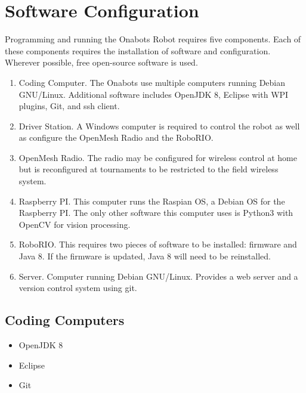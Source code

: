 \chapter{Software Configuration}

Programming and running the Onabots Robot requires five components. Each of these components requires the installation of software and configuration. Wherever possible, free open-source software is used.

\begin{enumerate}[label=$\Box$]

	\item Coding Computer. The Onabots use multiple computers running Debian GNU/Linux. Additional software includes OpenJDK 8, Eclipse with WPI plugins, Git, and ssh client.

	\item Driver Station. A Windows computer is required to control the robot as well as configure the OpenMesh Radio and the RoboRIO.

	\item OpenMesh Radio. The radio may be configured for wireless control at home but is reconfigured at tournaments to be restricted to the field wireless system.

	\item Raspberry PI. This computer runs the Raspian OS, a Debian OS for the Raspberry PI. The only other software this computer uses is Python3 with OpenCV for vision processing.

	\item RoboRIO. This requires two pieces of software to be installed: firmware and Java 8. If the firmware is updated, Java 8 will need to be reinstalled.

	\item Server. Computer running Debian GNU/Linux. Provides a web server and a version control system using git.
	
\end{enumerate}




\newpage\section*{Coding Computers}

\begin{itemize}

\item OpenJDK 8

\item Eclipse

\item Git

\end{itemize}





